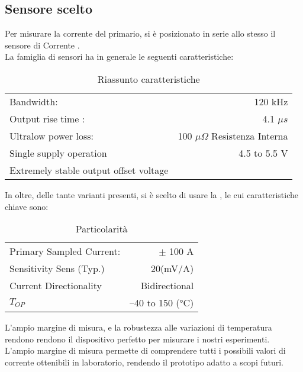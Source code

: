 \subsection{Sensore scelto}
Per misurare la corrente del primario, si è posizionato in serie allo stesso il sensore di Corrente \cite{ACS770}.\\
La famiglia di sensori ha in generale le seguenti caratteristiche:
\begin{table}[h]
	\caption[\cite{ACS770}  Riassunto caratteristiche]{Riassunto caratteristiche}
	\centering
	\begin{tabular}[t]{|l r|}
		\hline
		Bandwidth:                             & 120 kHz                               \\
		Output rise time :                     & 4.1 $ \mu s $                         \\
		Ultralow power loss:                   & 100 $ \mu \Omega $ Resistenza Interna \\
		Single supply operation                & 4.5 to 5.5 V                          \\
		Extremely stable output offset voltage &                                       \\
		\hline
	\end{tabular}
	
\end{table}

\noindent
In oltre, delle tante varianti presenti, si è scelto di usare la , le cui caratteristiche chiave sono:

\begin{table}[h]
	\centering
	\caption[ Particolarità]{ Particolarità}
	\begin{tabular}[t]{|l r|}
		\hline
		Primary Sampled Current: & $\pm$ 100 A     \\
		Sensitivity Sens (Typ.)  & 20(mV/A)        \\
		Current Directionality   & Bidirectional   \\
		$T_{OP}$                 & –40 to 150 (°C) \\
		\hline
	\end{tabular}
	
\end{table}

\noindent
L'ampio margine di misura, e la robustezza alle variazioni di temperatura rendono rendono il dispositivo perfetto per misurare i nostri esperimenti.\\
L'ampio margine di misura permette di comprendere tutti i possibili valori di corrente ottenibili in laboratorio, rendendo il prototipo adatto a scopi futuri.
